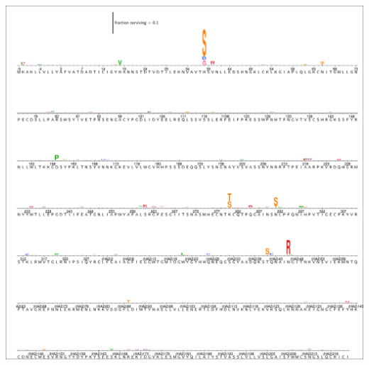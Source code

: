 \documentclass[11pt]{article}
\begin{document}
\begin{suppfigure}
\centerline{\includegraphics[trim=0.1cm 0.02cm 0.1cm 0.03cm,clip=true,width=\textwidth]{figs/logoplots/C179_fracsurvive.pdf}}
\caption{\label{suppfig:C179logo}
{\bf The excess fraction surviving selection with antibody C179 for all amino-acid mutations.}
The excess fraction surviving for each replicate was computed using Equation~\ref{eq:fracsurvive_excess}, then we took the median across all technical and biological replicates for each antibody concentration, and then took the medians of those values across concentrations.
The height of each letter is proportional to the excess fraction surviving of virions with that mutation.
The scale bar at the top of the plot relates the letter heights to the actual fractions.
The sites are labeled using H3 numbering.
}
\end{suppfigure}
\end{document}
